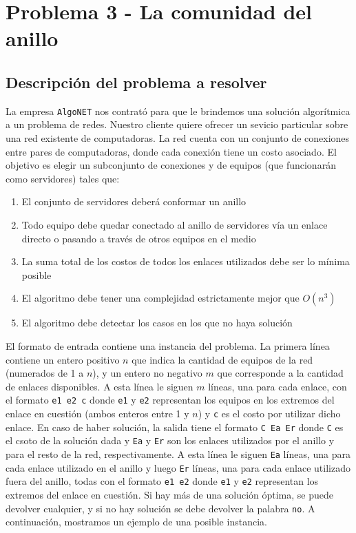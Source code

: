 \documentclass[11pt, a4paper, twoside]{article}
\begin{document}


\clearpage
\section{Problema 3 - La comunidad del anillo}

\subsection{Descripción del problema a resolver}
La empresa \texttt{AlgoNET} nos contrató para que le brindemos una 
solución algorítmica a un problema de redes. Nuestro cliente quiere ofrecer
un sevicio particular sobre una red existente de computadoras. La red cuenta
con un conjunto de conexiones entre pares de computadoras, donde cada 
conexión tiene un costo asociado. El objetivo es elegir un subconjunto de 
conexiones y de equipos (que funcionarán como servidores) tales que:
\begin{enumerate}
  \item El conjunto de servidores deberá conformar un anillo
  \item Todo equipo debe quedar conectado al anillo de servidores vía un 
        enlace directo o pasando a través de otros equipos en el medio
  \item La suma total de los costos de todos los enlaces utilizados debe
        ser lo mínima posible
  \item El algoritmo debe tener una complejidad estrictamente mejor que $O(n^3)$
  \item El algoritmo debe detectar los casos en los que no haya solución
\end{enumerate}

El formato de entrada contiene una instancia del problema. La primera línea 
contiene un entero positivo $n$ que indica la cantidad de equipos de la red
(numerados de 1 a $n$), y un entero no negativo $m$ que corresponde a la 
cantidad de enlaces disponibles. A esta línea le siguen $m$ líneas, una para
cada enlace, con el formato \texttt{e1 e2 c} donde \texttt{e1} y \texttt{e2}
representan los equipos en los extremos del enlace en cuestión (ambos enteros
entre 1 y $n$) y \texttt{c} es el costo por utilizar dicho enlace. En caso de
haber solución, la salida tiene el formato \texttt{C Ea Er} donde \texttt{C} es
el csoto de la solución dada y \texttt{Ea} y \texttt{Er} son los enlaces 
utilizados por el anillo y para el resto de la red, respectivamente. A esta línea
le siguen \texttt{Ea} líneas, una para cada enlace utilizado en el anillo y luego
\texttt{Er} líneas, una para cada enlace utilizado fuera del anillo, todas con el 
formato \texttt{e1 e2} donde \texttt{e1} y \texttt{e2} representan los extremos
del enlace en cuestión. Si hay más de una solución óptima, se puede devolver 
cualquier, y si no hay solución se debe devolver la palabra \texttt{no}. A 
continuación, mostramos un ejemplo de una posible instancia.
\end{document}
